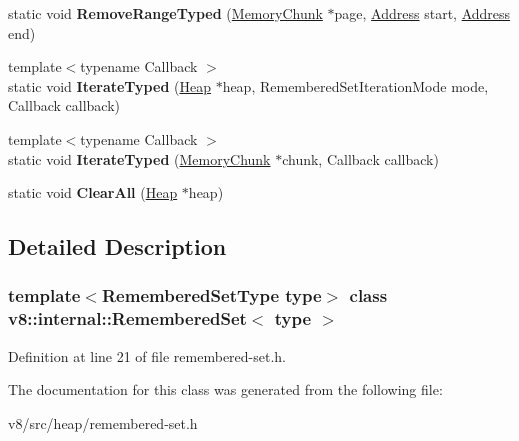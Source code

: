 \begin{DoxyCompactItemize}
static void {\bfseries Remove\+Range\+Typed} (\mbox{\hyperlink{classv8_1_1internal_1_1MemoryChunk}{Memory\+Chunk}} $\ast$page, \mbox{\hyperlink{classuintptr__t}{Address}} start, \mbox{\hyperlink{classuintptr__t}{Address}} end)
\item 
\mbox{\label{classv8_1_1internal_1_1RememberedSet_aec84a1fa7382d8e5bd8c9b44e5dea3c9}} 
{\footnotesize template$<$typename Callback $>$ }\\static void {\bfseries Iterate\+Typed} (\mbox{\hyperlink{classv8_1_1internal_1_1Heap}{Heap}} $\ast$heap, Remembered\+Set\+Iteration\+Mode mode, Callback callback)
\item 
\mbox{\label{classv8_1_1internal_1_1RememberedSet_aa5e746c1ad3c2ed0e8759e3b66c2dd63}} 
{\footnotesize template$<$typename Callback $>$ }\\static void {\bfseries Iterate\+Typed} (\mbox{\hyperlink{classv8_1_1internal_1_1MemoryChunk}{Memory\+Chunk}} $\ast$chunk, Callback callback)
\item 
\mbox{\label{classv8_1_1internal_1_1RememberedSet_a62fe759ca5f6b7cc5c38a151bd808239}} 
static void {\bfseries Clear\+All} (\mbox{\hyperlink{classv8_1_1internal_1_1Heap}{Heap}} $\ast$heap)
\end{DoxyCompactItemize}


\subsection{Detailed Description}
\subsubsection*{template$<$Remembered\+Set\+Type type$>$\newline
class v8\+::internal\+::\+Remembered\+Set$<$ type $>$}



Definition at line 21 of file remembered-\/set.\+h.



The documentation for this class was generated from the following file\+:\begin{DoxyCompactItemize}
\item 
v8/src/heap/remembered-\/set.\+h\end{DoxyCompactItemize}

